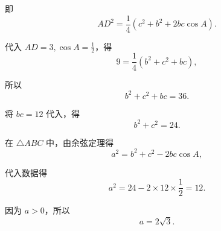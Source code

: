 {  即
  \[ AD^2 = \frac{1}{4}(c^2 + b^2 + 2bc\cos A). \]
  
  代入 $AD = 3, \cos A = \frac{1}{2}$，得
  \[ 9 = \frac{1}{4}(b^2 + c^2 + bc), \]
  
  所以
  \[ b^2 + c^2 + bc = 36. \]
  
  将 $bc = 12$ 代入，得
  \[ b^2 + c^2 = 24. \]
  
  在 $\triangle ABC$ 中，由余弦定理得
  \[ a^2 = b^2 + c^2 - 2bc\cos A, \]
  
  代入数据得
  \[ a^2 = 24 - 2 \times 12 \times \frac{1}{2} = 12. \]
  
  因为 $a > 0$，所以
  \[ a = 2\sqrt{3}. \]
}

\newcommand{\qTriangleAreaOneDiagnosis}{%
  （留白待收集学生作答后补充）%
}

\newcommand{\qTriangleAreaOneTeachingNotes}{%
  精讲。第(1)问考察边角互化及和差角公式，重点提示 \(\sin C = \sin(A+B)\) 的展开；第(2)问考察中线长公式或向量平方求模，以及面积公式与余弦定理的结合使用。%
}
